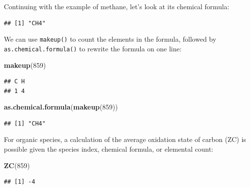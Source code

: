 \documentclass[]{tufte-handout}
\newenvironment{Shaded}{}{}
\newcommand{\KeywordTok}[1]{\textcolor[rgb]{0.00,0.44,0.13}{\textbf{#1}}}
\newcommand{\DecValTok}[1]{\textcolor[rgb]{0.25,0.63,0.44}{#1}}
\newcommand{\OperatorTok}[1]{\textcolor[rgb]{0.40,0.40,0.40}{#1}}
\newcommand{\NormalTok}[1]{#1}
\begin{document}
Continuing with the example of methane, let's look at its chemical
formula:

\begin{Shaded}
\end{Shaded}

\begin{verbatim}
## [1] "CH4"
\end{verbatim}

We can use {\texttt{makeup()}} to count the elements in the formula,
followed by {\texttt{as.chemical.formula()}} to rewrite the formula on
one line:

\begin{Shaded}
\begin{Highlighting}[]
\KeywordTok{makeup}\NormalTok{(}\DecValTok{859}\NormalTok{)}
\end{Highlighting}
\end{Shaded}

\begin{verbatim}
## C H 
## 1 4
\end{verbatim}

\begin{Shaded}
\begin{Highlighting}[]
\KeywordTok{as.chemical.formula}\NormalTok{(}\KeywordTok{makeup}\NormalTok{(}\DecValTok{859}\NormalTok{))}
\end{Highlighting}
\end{Shaded}

\begin{verbatim}
## [1] "CH4"
\end{verbatim}

For organic species, a calculation of the average oxidation state of
carbon (ZC) is possible given the species index, chemical formula, or
elemental count:

\begin{Shaded}
\begin{Highlighting}[]
\KeywordTok{ZC}\NormalTok{(}\DecValTok{859}\NormalTok{)}
\end{Highlighting}
\end{Shaded}

\begin{verbatim}
## [1] -4
\end{verbatim}

\begin{Shaded}
\end{Shaded}
\end{document}
